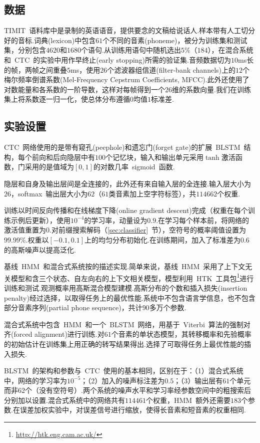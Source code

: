 \documentclass{ctexart}
\begin{document}
\subsection{数据}
TIMIT~语料库中是录制的英语语音，提供要念的文稿给说话人.样本带有人工切分好的音标.词典(lexicon)中包含$61$个不同的音素(phoneme)，被分为训练集和测试集，分别包含$4620$和$1680$个语句.从训练用语句中随机选出$5$\%（$184$），在混合系统和~CTC~的实验中用作早终止(early stopping)所需的验证集.音频数据切为$10$ms长的帧，两帧之间重叠$5$ms，使用$26$个滤波器组信道(filter-bank channels)上的$12$个梅尔频率倒谱系数(Mel-Frequency Cepstrum Coefficients, MFCC).此外还使用了对数能量和各系数的一阶导数，这样对每帧得到一个$26$维的系数向量.我们在训练集上将系数逐一归一化，使总体分布遵循$0$均值$1$标准差.
\subsection{实验设置}
CTC~网络使用的是带有窥孔(peephole)和遗忘门(forget gate)的扩展~BLSTM~结构\citep{gers2003learning}，每个前向和后向隐层中有$100$个记忆块，输入和输出单元采用$\tanh$激活函数，门采用的是值域为$[0,1]$的对数几率~sigmoid~函数.

隐层和自身及输出层间是全连接的，此外还有来自输入层的全连接.输入层大小为$26$，softmax~输出层大小为$62$（$61$类音素加上空字符标签），共$114662$个权重.

训练以时间反向传播和在线梯度下降(online gradient descent)完成（权重在每个训练示例后更新），使用$10^{-4}$的学习率，动量设为$0.9$.在学习每个样本前，将网络的激活值重置为$0$.对前缀搜索解码（\ref{sec:classifier}~节），空符号的概率阈值设置为$99.99$\%.权重以$[-0.1,0.1]$上的均匀分布初始化.在训练期间，加入了标准差为$0.6$的高斯噪声以提高泛化.

基线~HMM~和混合式系统按\citep{graves2005framewise}的描述实现.简单来说，基线~HMM~采用了上下文无关模型和含三个状态、自左向右的上下文相关模型，模型利用~HTK~工具包\footnote{\url{http://htk.eng.cam.ac.uk/}}进行训练和测试.观测概率用高斯混合模型建模.高斯分布的个数和插入损失(insertion penalty)经过选择，以取得任务上的最优性能.系统中不包含语言学信息，也不包含部分音素序列(partial phone sequence)，共计$90$多万个参数.

混合式系统中包含~HMM~和一个~BLSTM~网络，用基于~Viterbi~算法的强制对齐(forced alignment)进行训练\citep{robinson1994an}.对$61$个音素的单状态模型，其转移概率和先验概率的初始估计在训练集上用正确的转写结果得出.选择了可取得任务上最优性能的插入损失.

BLSTM~的架构和参数与~CTC~使用的基本相同，区别在于：（1）混合式系统中，网络的学习率为$10^{-5}$；（2）加入的噪声标注差为$0.5$；（3）输出层有$61$个单元而非$62$个（没有空符号）.两个系统的噪声水平和学习率经参数空间中的粗搜索后分别加以设置.混合式系统中的网络共有$114461$个权重，HMM~额外还需要$183$个参数.在误差加权实验中，对误差信号进行缩放，使得长音素和短音素的权重相同\citep{robinson1991several}.
\end{document}
